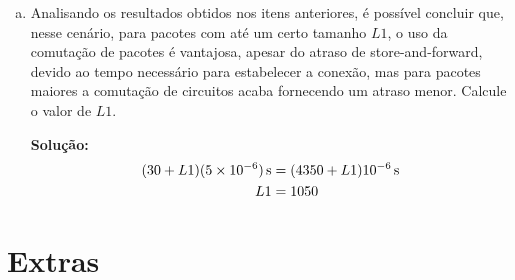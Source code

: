 \documentclass{article}
\begin{document}
\begin{enumerate}
\begin{enumerate}[a)]
\begin{addmargin}[0.5in]{0.5in}
\end{addmargin}

\item Analisando os resultados obtidos nos itens anteriores, é possível concluir que, nesse cenário, para pacotes com até um certo tamanho $L1$, o uso da comutação de pacotes é vantajosa, apesar do atraso de store-and-forward, devido ao tempo necessário para estabelecer a conexão, mas para pacotes maiores a comutação de circuitos acaba fornecendo um atraso menor. Calcule o valor de $L1$.

\begin{addmargin}[0.5in]{0.5in}
\par \textbf{Solução:}
\begin{equation} \label{eq2}
\begin{split}
\unit[(30 + L1)(5 \times 10^{-6})]{s} & = \unit[(4350 + L1) 10^{-6}]{s}\\
L1 & = 1050
\end{split}
\end{equation}
 
\end{addmargin}

\end{enumerate}
\end{enumerate}

\section*{Extras}
\end{document}
